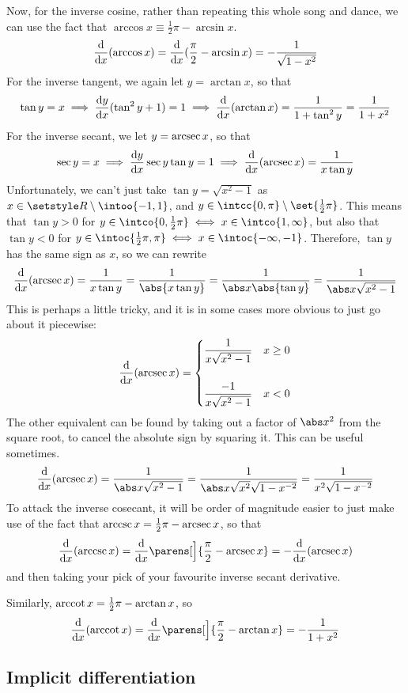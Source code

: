 Now, for the inverse cosine, rather than repeating this whole song and
dance, we can use the fact that
\(\arccos x \equiv \frac 12 \pi - \arcsin x\).
\begin{equation*}
 \dv{x}(\arccos x) = \dv{x}(\frac \pi 2 - \arcsin x)
     = -\frac 1{\sqrt{1 - x^2}}
\end{equation*}
For the inverse tangent, we again let \(y = \arctan x\), so that
\begin{equation*}
 \tan y = x \implies \dv<y>{x}(\tan^2 y + 1) = 1
     \implies \dv{x}(\arctan x) = \frac 1{1 + \tan^2 y}
         = \frac 1{1 + x^2}
\end{equation*}
For the inverse secant, we let \(y = \operatorname{arcsec} x\), so that
\begin{equation*}
 \sec y = x \implies \dv<y>{x} \sec y \tan y = 1
     \implies \dv{x}(\arcsec x) = \frac 1{x \tan y}
\end{equation*}
Unfortunately, we can't just take \(\tan y = \sqrt{x^2 - 1}\) as
\(x \in \Reals \setminus \intoo{-1, 1}\), and
\(y \in \intcc{0, \pi} \setminus \set{\frac 12 \pi}\). This means that
\(\tan y > 0\) for
\(y \in \intco{0, \frac 12 \pi} \iff x \in \intco{1, \infty}\), but also
that \(\tan y < 0\) for
\(y \in \intoc{\frac 12 \pi, \pi} \iff x \in \intoc{-\infty, -1}\).
Therefore, \(\tan y\) has the same sign as \(x\), so we can rewrite
\begin{equation*}
 \dv{x}(\arcsec x) = \frac 1{x \tan y} = \frac 1{\abs{x \tan y}}
     = \frac 1{\abs x\abs{\tan y}} = \frac 1{\abs x\sqrt{x^2 - 1}}
\end{equation*}
This is perhaps a little tricky, and it is in some cases more obvious to
just go about it piecewise:
\begin{equation*}
 \dv{x}(\arcsec x) =
 \begin{dcases}
  \frac 1{x\sqrt{x^2 - 1}} & x \ge 0 \\[3ex]
  \frac {-1}{x\sqrt{x^2 - 1}} & x < 0
 \end{dcases}
\end{equation*}
The other equivalent can be found by taking out a factor of \(\abs x^2\)
from the square root, to cancel the absolute sign by squaring it. This can
be useful sometimes.
\begin{equation*}
 \dv{x}(\arcsec x) = \frac 1{\abs x\sqrt{x^2 - 1}}
     = \frac 1{\abs x\sqrt{x^2}\sqrt{1 - x^{-2}}}
     = \frac 1{x^2\sqrt{1 - x^{-2}}}
\end{equation*}
To attack the inverse cosecant, it will be order of magnitude easier to just
make use of the fact that \(\operatorname{arccsc} x = \frac 12 \pi - \operatorname{arcsec} x\),
so that
\begin{equation*}
 \dv{x}(\arccsc x) = \dv{x}\parens[\Big]{\frac \pi 2 - \arcsec x}
                   = -\dv{x}(\arcsec x)
\end{equation*}
and then taking your pick of your favourite inverse secant derivative.

Similarly, \(\operatorname{arccot} x = \frac 12 \pi - \arctan x\), so
\begin{equation*}
 \dv{x}(\arccot x) = \dv{x}\parens[\Big]{\frac \pi 2 - \arctan x}
                   = -\frac 1{1 + x^2}
\end{equation*}

\subsection{Implicit differentiation}


